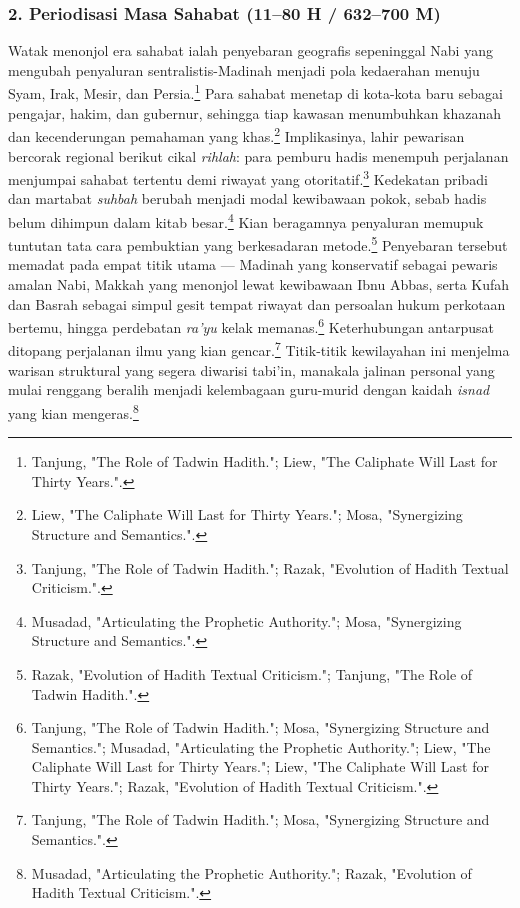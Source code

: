 \subsubsection*{2. Periodisasi Masa Sahabat (11--80 H / 632--700 M)}

Watak menonjol era sahabat ialah penyebaran geografis sepeninggal Nabi yang mengubah penyaluran sentralistis-Madinah menjadi pola kedaerahan menuju Syam, Irak, Mesir, dan Persia.\footnote{Tanjung, "The Role of Tadwin Hadith."; Liew, "The Caliphate Will Last for Thirty Years.".} Para sahabat menetap di kota-kota baru sebagai pengajar, hakim, dan gubernur, sehingga tiap kawasan menumbuhkan khazanah dan kecenderungan pemahaman yang khas.\footnote{Liew, "The Caliphate Will Last for Thirty Years."; Mosa, "Synergizing Structure and Semantics.".} Implikasinya, lahir pewarisan bercorak regional berikut cikal \textit{rihlah}: para pemburu hadis menempuh perjalanan menjumpai sahabat tertentu demi riwayat yang otoritatif.\footnote{Tanjung, "The Role of Tadwin Hadith."; Razak, "Evolution of Hadith Textual Criticism.".} Kedekatan pribadi dan martabat \textit{suhbah} berubah menjadi modal kewibawaan pokok, sebab hadis belum dihimpun dalam kitab besar.\footnote{Musadad, "Articulating the Prophetic Authority."; Mosa, "Synergizing Structure and Semantics.".} Kian beragamnya penyaluran memupuk tuntutan tata cara pembuktian yang berkesadaran metode.\footnote{Razak, "Evolution of Hadith Textual Criticism."; Tanjung, "The Role of Tadwin Hadith.".} Penyebaran tersebut memadat pada empat titik utama --- Madinah yang konservatif sebagai pewaris amalan Nabi, Makkah yang menonjol lewat kewibawaan Ibnu Abbas, serta Kufah dan Basrah sebagai simpul gesit tempat riwayat dan persoalan hukum perkotaan bertemu, hingga perdebatan \textit{ra'yu} kelak memanas.\footnote{Tanjung, "The Role of Tadwin Hadith."; Mosa, "Synergizing Structure and Semantics."; Musadad, "Articulating the Prophetic Authority."; Liew, "The Caliphate Will Last for Thirty Years."; Liew, "The Caliphate Will Last for Thirty Years."; Razak, "Evolution of Hadith Textual Criticism.".} Keterhubungan antarpusat ditopang perjalanan ilmu yang kian gencar.\footnote{Tanjung, "The Role of Tadwin Hadith."; Mosa, "Synergizing Structure and Semantics.".} Titik-titik kewilayahan ini menjelma warisan struktural yang segera diwarisi tabi'in, manakala jalinan personal yang mulai renggang beralih menjadi kelembagaan guru-murid dengan kaidah \textit{isnad} yang kian mengeras.\footnote{Musadad, "Articulating the Prophetic Authority."; Razak, "Evolution of Hadith Textual Criticism.".}

